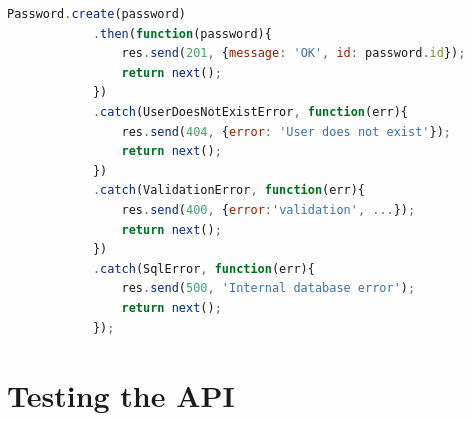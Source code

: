 		\begin{lstlisting}[language=Javascript,gobble=12,caption={Example of error handling, when creating new password},label={lst:example:errorhandle:password:create}]
            Password.create(password)
            .then(function(password){
                res.send(201, {message: 'OK', id: password.id});
                return next();
            })
            .catch(UserDoesNotExistError, function(err){
                res.send(404, {error: 'User does not exist'});
                return next();
            })
            .catch(ValidationError, function(err){
                res.send(400, {error:'validation', ...});
                return next();
            })
            .catch(SqlError, function(err){
                res.send(500, 'Internal database error');
                return next();
            });
		\end{lstlisting}

	\section{Testing the API}
		\label{sec:impl:tests}



































